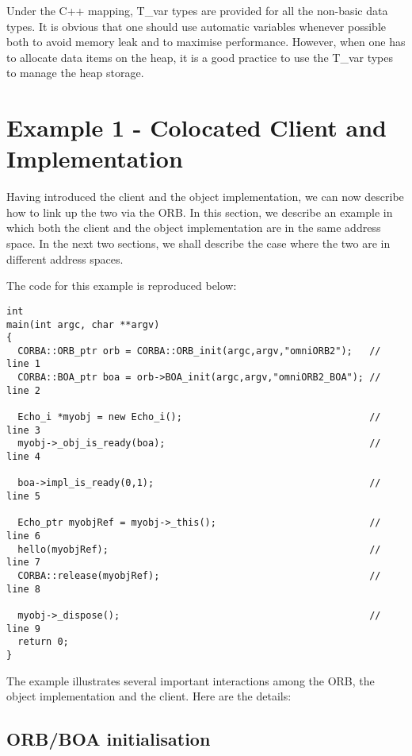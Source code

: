 \documentclass[11pt,twoside,onecolumn]{book}
\begin{document}
Under the C++ mapping, T\_var types are provided for all the non-basic data
types.  It is obvious that one should use automatic variables whenever
possible both to avoid memory leak and to maximise performance. However,
when one has to allocate data items on the heap, it is a good practice to
use the T\_var types to manage the heap storage.

\section{Example 1 - Colocated Client and Implementation}
\label{objeg1}

Having introduced the client and the object implementation, we can now
describe how to link up the two via the ORB. In this section, we describe
an example in which both the client and the object implementation are in
the same address space. In the next two sections, we shall describe the
case where the two are in different address spaces.

The code for this example is reproduced below:

{\small
\begin{verbatim}
int
main(int argc, char **argv)
{
  CORBA::ORB_ptr orb = CORBA::ORB_init(argc,argv,"omniORB2");   // line 1
  CORBA::BOA_ptr boa = orb->BOA_init(argc,argv,"omniORB2_BOA"); // line 2

  Echo_i *myobj = new Echo_i();                                 // line 3
  myobj->_obj_is_ready(boa);                                    // line 4

  boa->impl_is_ready(0,1);                                      // line 5

  Echo_ptr myobjRef = myobj->_this();                           // line 6
  hello(myobjRef);                                              // line 7
  CORBA::release(myobjRef);                                     // line 8

  myobj->_dispose();                                            // line 9
  return 0;
}
\end{verbatim}
}

The example illustrates several important interactions among the ORB, the
object implementation and the client. Here are the details:

\subsection{ORB/BOA initialisation}
\end{document}
